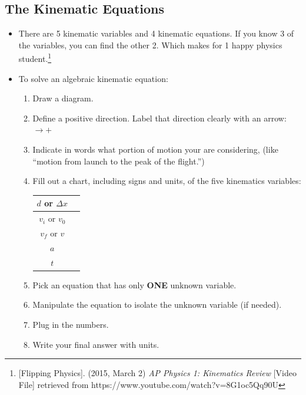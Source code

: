 \documentclass[letterpaper, 12pt]{article}
\begin{document}
\subsection*{The Kinematic Equations}
\begin{itemize}
	\item There are 5 kinematic variables and 4 kinematic equations.  If you know 3 of the variables, you can find the other 2.  Which makes for 1 happy physics student.\footnote{ [Flipping Physics].  (2015, March 2) \textit{AP Physics 1: Kinematics Review} [Video File] retrieved from https://www.youtube.com/watch?v=8G1oc5Qq90U }
	\item To solve an algebraic kinematic equation: 
		\begin{enumerate}
			\item Draw a diagram.
			\item Define a positive direction.  Label that direction clearly with an arrow: $\longrightarrow + $
			\item Indicate in words what portion of motion your are considering, (like ``motion from launch to the peak of the flight.”)
			\item Fill out a chart, including signs and units, of the five kinematics variables:
			\begin{center}
			\begin{tabular} {| c | c | }
				\hline
				$d$ or $\Delta x$  & \hspace{0.4in} \\
				\hline
				$v_i$ or $v_0$ & \hspace{0.4in} \\
				\hline
				$v_f$ or $v $ & \hspace{0.4in} \\
				\hline
				$a$ & \hspace{0.4in} \\
				\hline
				$t$ & \hspace{0.4in} \\
				\hline
			\end{tabular} 
			\end{center}
		\item Pick an equation that has only \textbf{ONE} unknown variable.  
		\item Manipulate the equation to isolate the unknown variable (if needed).
		\item Plug in the numbers.
		\item Write your final answer with units. 
			
		\end{enumerate}
	
\end{itemize}
\vspace{1in}
\end{document}
